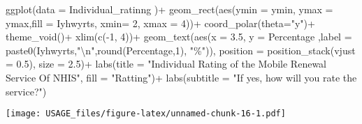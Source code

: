 \documentclass[
]{article}
\newenvironment{Shaded}{\begin{snugshade}}{\end{snugshade}}
\newcommand{\AttributeTok}[1]{\textcolor[rgb]{0.77,0.63,0.00}{#1}}
\newcommand{\DecValTok}[1]{\textcolor[rgb]{0.00,0.00,0.81}{#1}}
\newcommand{\FloatTok}[1]{\textcolor[rgb]{0.00,0.00,0.81}{#1}}
\newcommand{\FunctionTok}[1]{\textcolor[rgb]{0.00,0.00,0.00}{#1}}
\newcommand{\NormalTok}[1]{#1}
\newcommand{\SpecialCharTok}[1]{\textcolor[rgb]{0.00,0.00,0.00}{#1}}
\newcommand{\StringTok}[1]{\textcolor[rgb]{0.31,0.60,0.02}{#1}}
\begin{document}
\begin{Shaded}
\begin{Highlighting}[]
\FunctionTok{ggplot}\NormalTok{(}\AttributeTok{data =}\NormalTok{ Individual\_ratinng )}\SpecialCharTok{+}
  \FunctionTok{geom\_rect}\NormalTok{(}\FunctionTok{aes}\NormalTok{(}\AttributeTok{ymin =}\NormalTok{ ymin, }\AttributeTok{ymax =}\NormalTok{ ymax,}\AttributeTok{fill =}\NormalTok{ Iyhwyrts,}
                         \AttributeTok{xmin=} \DecValTok{2}\NormalTok{, }\AttributeTok{xmax =} \DecValTok{4}\NormalTok{))}\SpecialCharTok{+}
  \FunctionTok{coord\_polar}\NormalTok{(}\AttributeTok{theta=}\StringTok{"y"}\NormalTok{)}\SpecialCharTok{+}
  \FunctionTok{theme\_void}\NormalTok{()}\SpecialCharTok{+}
  \FunctionTok{xlim}\NormalTok{(}\FunctionTok{c}\NormalTok{(}\SpecialCharTok{{-}}\DecValTok{1}\NormalTok{, }\DecValTok{4}\NormalTok{))}\SpecialCharTok{+}
  \FunctionTok{geom\_text}\NormalTok{(}\FunctionTok{aes}\NormalTok{(}\AttributeTok{x =} \FloatTok{3.5}\NormalTok{, }\AttributeTok{y =}\NormalTok{ Percentage ,}\AttributeTok{label =} \FunctionTok{paste0}\NormalTok{(Iyhwyrts,}\StringTok{"}\SpecialCharTok{\textbackslash{}n}\StringTok{"}\NormalTok{,}\FunctionTok{round}\NormalTok{(Percentage,}\DecValTok{1}\NormalTok{), }\StringTok{"\%"}\NormalTok{)),}
            \AttributeTok{position =} \FunctionTok{position\_stack}\NormalTok{(}\AttributeTok{vjust =} \FloatTok{0.5}\NormalTok{), }\AttributeTok{size =} \FloatTok{2.5}\NormalTok{)}\SpecialCharTok{+}
  \FunctionTok{labs}\NormalTok{(}\AttributeTok{title    =} \StringTok{"Individual Rating of the Mobile Renewal Service Of NHIS"}\NormalTok{,}
       \AttributeTok{fill =} \StringTok{"Ratting"}\NormalTok{)}\SpecialCharTok{+}
  \FunctionTok{labs}\NormalTok{(}\AttributeTok{subtitle =} \StringTok{"If yes, how will you rate the service?"}\NormalTok{)}
\end{Highlighting}
\end{Shaded}

\texttt{[image: USAGE\_files/figure-latex/unnamed-chunk-16-1.pdf]}
\end{document}

